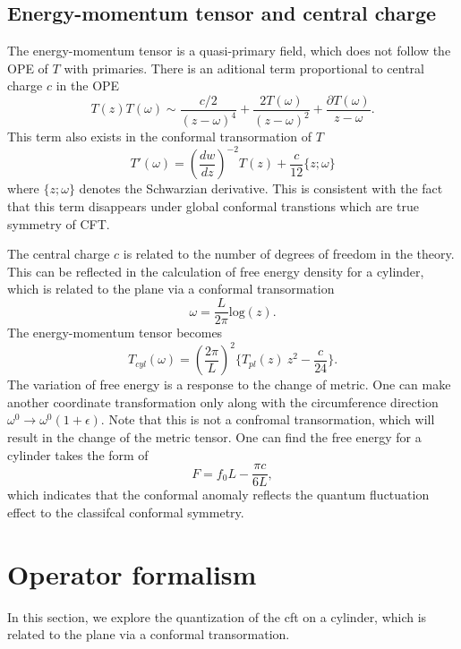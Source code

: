 \documentclass[submission, PhysLectNotes]{SciPost}
\begin{document}
\subsection{Energy-momentum tensor and central charge}
The energy-momentum tensor is a quasi-primary field, which does not follow the OPE of $T$ with primaries. There is an aditional term proportional to central charge $c$ in the OPE
\begin{equation}
T(z)T(\omega) \sim \frac{c/2}{\left(z-\omega\right)^4} + \frac{2 T(\omega)}{\left(z-\omega\right)^2} + \frac{\partial T(\omega)}{z-\omega}.
\end{equation}
This term also exists in the conformal transormation of $T$
\begin{equation}
T'(\omega) = \left(\frac{dw}{dz}\right)^{-2} T(z) + \frac{c}{12}\{z;\omega\}
\end{equation}
where $\{z;\omega\}$ denotes the Schwarzian derivative. This is consistent with the fact that this term disappears under global conformal transtions which are true symmetry of CFT.

The central charge $c$ is related to the number of degrees of freedom in the theory. This can be reflected in the calculation of free energy density for a cylinder, which is related to the plane via a conformal transormation
\begin{equation}
\omega = \frac{L}{2\pi} \mathrm{log} (z).
\end{equation}
The energy-momentum tensor becomes
\begin{equation}
T_{cyl}(\omega) = \left(\frac{2\pi}{L}\right)^2 \{T_{pl}(z)\ z^2 - \frac{c}{24}\}.
\end{equation}
The variation of free energy is a response to the change of metric. One can make another coordinate transformation only along with the circumference direction $\omega^0 \rightarrow \omega^0(1+\epsilon)$. Note that this is not a confromal transormation, which will result in the change of the metric tensor. One can find the free energy for a cylinder takes the form of
\begin{equation}
F = f_0 L - \frac{\pi c}{6L},
\end{equation}
which indicates that the conformal anomaly reflects the quantum fluctuation effect to the classifcal conformal symmetry.

\section{Operator formalism}
In this section, we explore the quantization of the cft on a cylinder, which is related to the plane via a conformal transormation.
\end{document}
